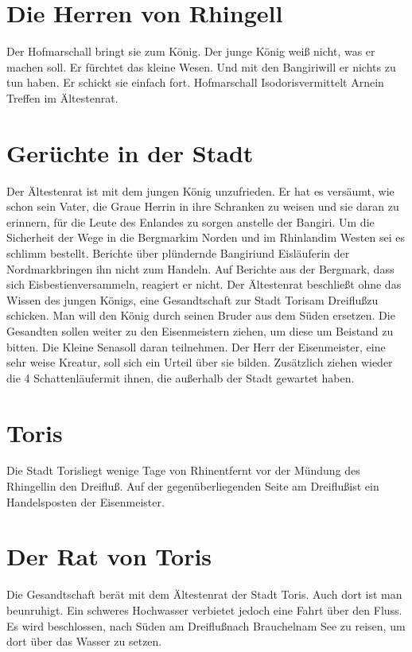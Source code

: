 \documentclass[12pt,a4paper,onecolumn,twoside,ngerman]{book}
\newcommand{\Sena}{Sena}
\newcommand{\Bangiri}{Bangiri}
\newcommand{\Enland}{Enland}
\newcommand{\Schattenlaufer}{Schattenläufer}
\newcommand{\Nordmark}{Nordmark}
\newcommand{\Bergmark}{Bergmark}
\newcommand{\Arn}{Arn}
\newcommand{\Eislaufer}{Eisläufer}
\newcommand{\Eisbestien}{Eisbestien}
\newcommand{\Rhinland}{Rhinland}
\newcommand{\Rhingell}{Rhingell}
\newcommand{\Rhin}{Rhin}
\newcommand{\Isodoris}{Isodoris}
\newcommand{\Dreifluss}{Dreifluß}
\newcommand{\Toris}{Toris}
\newcommand{\Braucheln}{Braucheln}
\newcommand{\Eisenmeister}{Eisenmeister}
\begin{document}
\section{Die Herren von \Rhingell}
Der Hofmarschall bringt sie zum König. Der junge König weiß nicht, was er machen soll. Er fürchtet das kleine Wesen. Und mit den \Bangiri will er nichts zu tun haben. Er schickt sie einfach fort. Hofmarschall \Isodoris vermittelt \Arn ein Treffen im Ältestenrat. 

\section{Gerüchte in der Stadt}
Der Ältestenrat ist mit dem jungen König unzufrieden. Er hat es versäumt, wie schon sein Vater, die Graue Herrin in ihre Schranken zu weisen und sie daran zu erinnern, für die Leute des \Enland{es} zu sorgen anstelle der \Bangiri. Um die Sicherheit der Wege in die \Bergmark im Norden und im \Rhinland im Westen sei es schlimm bestellt. Berichte über plündernde \Bangiri und \Eislaufer in der \Nordmark bringen ihn nicht zum Handeln. Auf Berichte aus der \Bergmark, dass sich \Eisbestien versammeln, reagiert er nicht.
Der Ältestenrat beschließt ohne das Wissen des jungen Königs, eine Gesandtschaft zur Stadt \Toris am \Dreifluss zu schicken. Man will den König durch seinen Bruder aus dem Süden ersetzen. Die Gesandten sollen weiter zu den \Eisenmeister{n} ziehen, um diese um Beistand zu bitten. Die Kleine \Sena soll daran teilnehmen. Der Herr der \Eisenmeister, eine sehr weise Kreatur, soll sich ein Urteil über sie bilden. Zusätzlich ziehen wieder die 4 \Schattenlaufer mit ihnen, die außerhalb der Stadt gewartet haben.

\section{\Toris}
Die Stadt \Toris liegt wenige Tage von \Rhin entfernt vor der Mündung des \Rhingell in den \Dreifluss. Auf der gegenüberliegenden Seite am \Dreifluss ist ein Handelsposten der \Eisenmeister.

\section{Der Rat von \Toris}
Die Gesandtschaft berät mit dem Ältestenrat der Stadt \Toris. Auch dort ist man beunruhigt. Ein schweres Hochwasser verbietet jedoch eine Fahrt über den Fluss. Es wird beschlossen, nach Süden am \Dreifluss nach \Braucheln am See zu reisen, um dort über das Wasser zu setzen.
\end{document}
